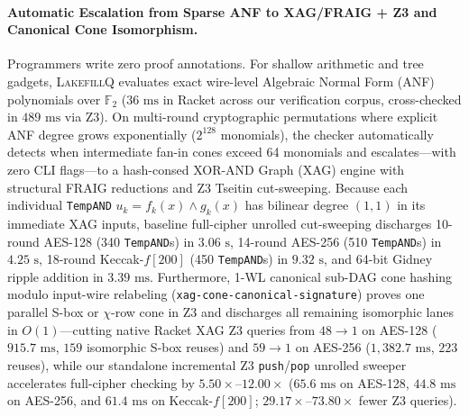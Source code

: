 \documentclass[acmsmall,screen,anonymous]{acmart}
\DeclareRobustCommand{\_}{\ifmmode\text{\char95}\else\char95\penalty0\relax\fi}
\theoremstyle{plain}
\newcommand{\LakefillQ}{\textsc{LakefillQ}}
\begin{document}
\paragraph{Automatic Escalation from Sparse ANF to XAG/FRAIG + Z3 and Canonical Cone Isomorphism.}
Programmers write zero proof annotations. For shallow arithmetic and tree gadgets, \LakefillQ{} evaluates exact wire-level Algebraic Normal Form (ANF) polynomials over $\mathbb{F}_2$ ($36\text{ ms}$ in Racket across our verification corpus, cross-checked in $489\text{ ms}$ via Z3). On multi-round cryptographic permutations where explicit ANF degree grows exponentially ($2^{128}$ monomials), the checker automatically detects when intermediate fan-in cones exceed 64 monomials and escalates---with zero CLI flags---to a hash-consed XOR-AND Graph (XAG) engine with structural FRAIG reductions and Z3 Tseitin cut-sweeping. Because each individual \texttt{TempAND} $u_k = f_k(x) \land g_k(x)$ has bilinear degree $(1,1)$ in its immediate XAG inputs, baseline full-cipher unrolled cut-sweeping discharges 10-round AES-128 (340 \texttt{TempAND}s) in $3.06\text{ s}$, 14-round AES-256 (510 \texttt{TempAND}s) in $4.25\text{ s}$, 18-round Keccak-$f[200]$ (450 \texttt{TempAND}s) in $9.32\text{ s}$, and 64-bit Gidney ripple addition in $3.39\text{ ms}$. Furthermore, 1-WL canonical sub-DAG cone hashing modulo input-wire relabeling (\texttt{xag-cone-canonical-signature}) proves one parallel S-box or $\chi$-row cone in Z3 and discharges all remaining isomorphic lanes in $O(1)$---cutting native Racket XAG Z3 queries from $48 \to 1$ on AES-128 ($915.7\text{ ms}$, $159$ isomorphic S-box reuses) and $59 \to 1$ on AES-256 ($1{,}382.7\text{ ms}$, $223$ reuses), while our standalone incremental Z3 \texttt{push}/\texttt{pop} unrolled sweeper accelerates full-cipher checking by $5.50\times$--$12.00\times$ ($65.6\text{ ms}$ on AES-128, $44.8\text{ ms}$ on AES-256, and $61.4\text{ ms}$ on Keccak-$f[200]$; $29.17\times$--$73.80\times$ fewer Z3 queries).
\end{document}
